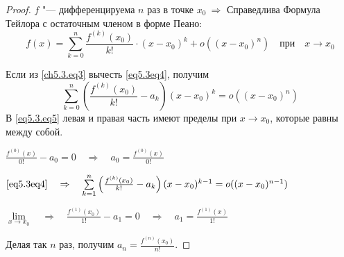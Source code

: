 \begin{proof}
$f$ "--- дифференцируема $n$ раз в точке $x_0 \ \Rightarrow$
Справедлива Формула Тейлора с остаточным членом в форме Пеано:
\begin{equation} \label{eq5.3eq4}
f(x) = \sum_{k = 0}^{n} \frac{f^{(k)}(x_0)}{k!} \cdot (x - x_0)^k + o((x - x_0)^n) \quad \text{при} \quad x \to x_0
\end{equation}

Если из \eqref{ch5.3.eq3} вычесть \eqref{eq5.3eq4}, получим
\begin{equation} \label{eq5.3.eq5}
\sum\limits_{k = 0}^{n} \left( \frac{f^{(k)}(x_0)}{k!} - a_k \right) (x - x_0)^k = o((x - x_0)^n)
\end{equation}
В \eqref{eq5.3.eq5} левая и правая часть имеют пределы при $x \to x_0$, которые равны между собой.

$\frac{f^{(0)}(x)}{0!} - a_0 = 0 \quad \Rightarrow \quad a_0 = \frac{f^{(0)}(x)}{0!}$

$\eqref{eq5.3eq4} \quad \Rightarrow \quad \sum\limits_{k = 1}^{n} \left( \frac{f^{(k)}(x_0)}{k!} - a_k \right) (x - x_0)^{k - 1} = o((x - x_0)^{n - 1})$

$\lim\limits_{x \to x_0} \quad \Rightarrow \quad \frac{f^{(1)}(x_0)}{1!} - a_1 = 0 \quad \Rightarrow \quad a_1 = \frac{f^{(1)}(x)}{1!}$

Делая так $n$ раз, получим $a_n = \frac{f^{(n)}(x_0)}{n!}$.
\end{proof}

